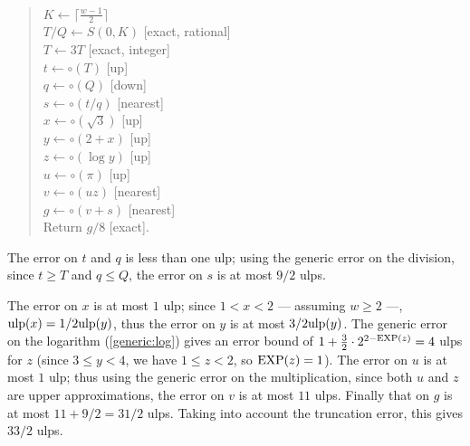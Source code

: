 \documentclass[12pt]{amsart}
\def\ulp{{\rm ulp}}
\def\Exp{{\rm EXP}}
\begin{document}
\begin{quote}
$K \leftarrow \lceil \frac{w-1}{2} \rceil$ \\
$T/Q \leftarrow S(0,K)$ [exact, rational] \\
$T \leftarrow 3T$ [exact, integer] \\
$t \leftarrow \circ(T)$ [up] \\
$q \leftarrow \circ(Q)$ [down] \\
$s \leftarrow \circ(t/q)$ [nearest] \\
$x \leftarrow \circ(\sqrt{3})$ [up] \\
$y \leftarrow \circ(2 + x)$ [up] \\
$z \leftarrow \circ(\log y)$ [up] \\
$u \leftarrow \circ(\pi)$  [up] \\
$v \leftarrow \circ(u z)$ [nearest] \\
$g \leftarrow \circ(v + s)$ [nearest] \\
Return $g/8$ [exact].
\end{quote}
The error on $t$ and $q$ is less than one ulp;
using the generic error on the division, since $t \geq T$ and $q \leq Q$,
the error on $s$ is at most $9/2$ ulps.

The error on $x$ is at most $1$ ulp; since $1 < x < 2$ --- assuming
$w \geq 2$ ---, $\ulp(x) = 1/2 \ulp(y)$, thus the error on $y$ is at most
$3/2 \ulp(y)$.
The generic error on the logarithm (\textsection\ref{generic:log})
gives an error bound of $1 + \frac{3}{2} \cdot 2^{2-\Exp(z)} = 4$ ulps for $z$
(since $3 \leq y < 4$, we have $1 \leq z < 2$, so $\Exp(z) = 1$).
The error on $u$ is at most $1$ ulp; thus using the generic error on the
multiplication, since both $u$ and $z$ are upper approximations,
the error on $v$ is at most $11$ ulps.
Finally that on $g$ is at most $11 + 9/2 = 31/2$ ulps.
Taking into account the truncation error, this gives $33/2$ ulps.

\nocite{BoBo98,DeHi02,HuAb86,Jones84}



\end{document}
